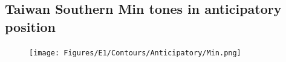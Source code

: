 \documentclass[12pt]{report}
\begin{document}
\begin{CJK}{UTF8}{bsmi}
\pagebreak
\section{Taiwan Southern Min tones in anticipatory position}
\begin{figure}[hbt!]
\centering
\texttt{[image: Figures/E1/Contours/Anticipatory/Min.png]}
\end{figure}
	
\end{CJK}	
\end{document}
